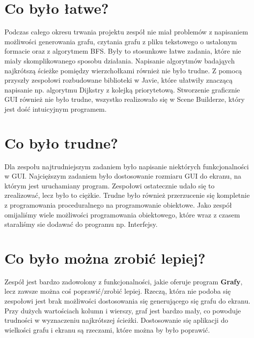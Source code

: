 \documentclass[10pt]{article}
\begin{document}
\section{Co było łatwe?}
Podczas całego okresu trwania projektu zespół nie miał problemów z napisaniem możliwości generowania grafu, czytania grafu z pliku tekstowego o ustalonym formacie oraz z algorytmem BFS. Były to stosunkowe łatwe zadania, które nie miały skomplikowanego sposobu działania. Napisanie algorytmów badająych najkrótszą ścieżke pomiędzy wierzchołkami również nie było trudne. Z pomocą przyszły zespołowi rozbudowane biblioteki w Javie, które ułatwiły znaczącą napisanie np. algorytmu Dijkstry z kolejką priorytetową. Stworzenie graficznie GUI również nie było trudne, wszystko realizowało się w Scene Builderze, który jest dość intuicyjnym programem.
\section{Co było trudne?}
Dla zespołu najtrudniejszym zadaniem było napisanie niektórych funkcjonalności w GUI. Najcięższym zadaniem było dostosowanie rozmiaru GUI do ekranu, na którym jest uruchamiany program. Zespołowi ostatecznie udało się to zrealizować, lecz było to ciężkie. Trudne było również przerzucenie się kompletnie z programowania proceduralnego na programowanie obiektowe. Jako zespół omijaliśmy wiele możliwości programowania obiektowego, które wraz z czasem staraliśmy sie dodawać do programu np. Interfejsy.
\section{Co było można zrobić lepiej?}
Zespół jest bardzo zadowolony z funkcjonalności, jakie oferuje program \textbf{Grafy}, lecz zawsze można coś poprawić/zrobić lepiej. Rzeczą, która nie podoba się zespołowi jest brak możliwości dostosowania się generującego się grafu do ekranu. Przy dużych wartościach kolumn i wierszy, graf jest bardzo mały, co powoduje trudności w wyznaczeniu najkrótszej ścieżki. Dostosowanie się aplikacji do wielkości grafu i ekranu są rzeczami, które można by było poprawić.
\end{document}

